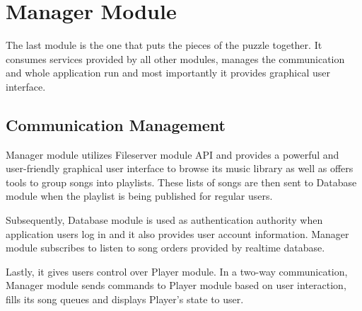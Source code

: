 \section {Manager Module}

The last module is the one that puts the pieces of the puzzle together. It consumes services provided by all other modules, manages the communication and whole application run and most importantly it provides graphical user interface.

\subsection {Communication Management}

Manager module utilizes Fileserver module API and provides a powerful and user-friendly graphical user interface to browse its music library as well as offers tools to group songs into playlists. These lists of songs are then sent to Database module when the playlist is being published for regular users.
\par
Subsequently, Database module is used as authentication authority when application users log in and it also provides user account information. Manager module subscribes to listen to song orders provided by realtime database.
\par
Lastly, it gives users control over Player module. In a two-way communication, Manager module sends commands to Player module based on user interaction, fills its song queues and displays Player's state to user.




